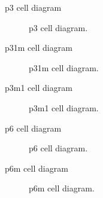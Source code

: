 \documentclass{beamer}
\theoremstyle{definition}
\begin{document}
\begin{frame}{p3 cell diagram}
    \begin{figure}
        \centering
        
        \caption{p3 cell diagram.}
        \label{fig:enter-label}
    \end{figure}
\end{frame}
\begin{frame}{p31m cell diagram}
    \begin{figure}
        \centering
        
        \caption{p31m cell diagram.}
        \label{fig:enter-label}
    \end{figure}
\end{frame}
\begin{frame}{p3m1 cell diagram}
    \begin{figure}
        \centering
        
        \caption{p3m1 cell diagram.}
        \label{fig:enter-label}
    \end{figure}
\end{frame}
\begin{frame}{p6 cell diagram}
    \begin{figure}
        \centering
        
        \caption{p6 cell diagram.}
        \label{fig:enter-label}
    \end{figure}
\end{frame}
\begin{frame}{p6m cell diagram}
    \begin{figure}
        \centering
        
        \caption{p6m cell diagram.}
        \label{fig:enter-label}
    \end{figure}
\end{frame}
\end{document}
